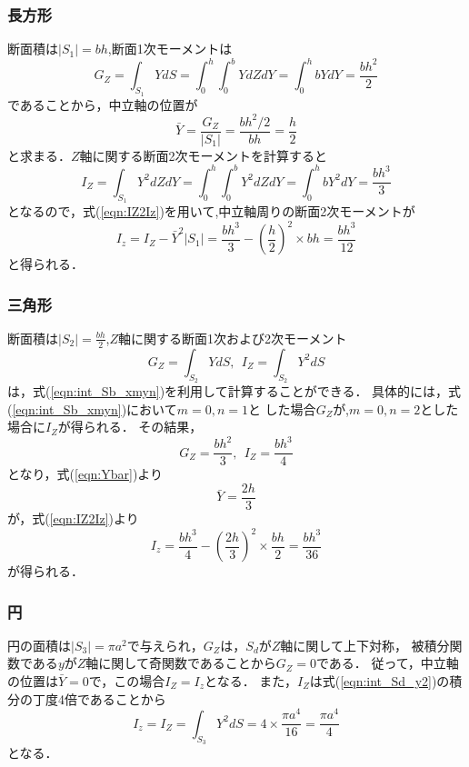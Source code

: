 \documentclass[10pt,a4j]{jarticle}
\begin{document}
\subsubsection{長方形}
断面積は$\left|S_1\right|=bh$,断面1次モーメントは
\begin{equation}
	G_Z=\int_{S_1} Y dS=\int_0^h\int_0^b Y dZdY=\int_0^h bYdY=\frac{bh^2}{2}
	\label{eqn:GZ_S1}
\end{equation}
であることから，中立軸の位置が
\begin{equation}
	\bar Y= \frac{G_Z}{\left| S_1 \right|}=\frac{bh^2/2}{bh}=\frac{h}{2}
\end{equation}
と求まる．$Z$軸に関する断面2次モーメントを計算すると
\begin{equation}
	I_Z=\int_{S_1} Y^2dZdY
	=\int_0^h \int_0^b Y^2dZdY 
	=\int_0^h bY^2dY 
	=\frac{bh^3}{3}
	\label{eqn:IZ_S1}
\end{equation}
となるので，式(\ref{eqn:IZ2Iz})を用いて,中立軸周りの断面2次モーメントが
\begin{equation}
	I_z= I_Z-\bar Y^2 \left| S_1 \right| = \frac{bh^3}{3}-\left(\frac{h}{2}\right)^2\times bh=\frac{bh^3}{12}
	\label{eqn:Iz_S1}
\end{equation}
と得られる．
\subsubsection{三角形}
断面積は$\left|S_2\right|=\frac{bh}{2}$,$Z$軸に関する断面1次および2次モーメント
\begin{equation}
	G_Z=\int_{S_2} Y dS, \ \ I_Z=\int_{S_2}Y^2 dS
\end{equation}
は，式(\ref{eqn:int_Sb_xmyn})を利用して計算することができる．
具体的には，式(\ref{eqn:int_Sb_xmyn})において$m=0, n=1$と
した場合$G_Z$が,$m=0, n=2$とした場合に$I_Z$が得られる．
その結果，
\begin{equation}
	G_Z=\frac{bh^2}{3}, \ \ 
	I_Z=\frac{bh^3}{4}
	\label{eqn:GI_S2}
\end{equation}
となり，式(\ref{eqn:Ybar})より
\begin{equation}
	\bar{Y}=\frac{2h}{3}
\end{equation}
が，式(\ref{eqn:IZ2Iz})より
\begin{equation}
	I_z=\frac{bh^3}{4}-\left(\frac{2h}{3}\right)^2\times \frac{bh}{2}=\frac{bh^3}{36}
	\label{eqn:Iz_S2}
\end{equation}
が得られる．
\subsubsection{円}
円の面積は$\left|S_3\right|=\pi a^2$で与えられ，$G_Z$は，$S_d$が$Z$軸に関して上下対称，
被積分関数である$y$が$Z$軸に関して奇関数であることから$G_Z=0$である．
従って，中立軸の位置は$\bar Y=0$で，この場合$I_Z=I_z$となる．
また，$I_Z$は式(\ref{eqn:int_Sd_y2})の積分の丁度4倍であることから
\begin{equation}
	I_z=I_Z=\int_{S_3}Y^2dS=4\times \frac{\pi a^4}{16}=\frac{\pi a^4}{4}
	\label{eqn:Iz_S3}
\end{equation}
となる．
\end{document}
